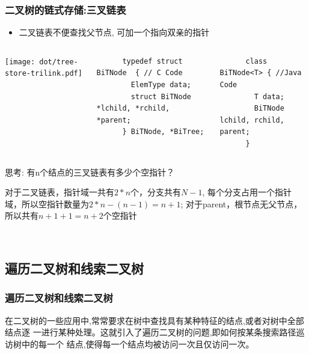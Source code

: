 \begin{frame}[fragile]
  \frametitle{二叉树的链式存储:三叉链表}
  \begin{itemize}
  \item 二叉链表不便查找父节点, 可加一个指向双亲的指针
  \end{itemize}

  \begin{columns}[T]
    \texttt{[image: dot/tree-store-trilink.pdf]}
    
    \begin{verbatim}
      typedef struct BiTNode  { // C Code
        ElemType data;
        struct BiTNode *lchild, *rchild, *parent;
      } BiTNode, *BiTree;
    \end{verbatim}

    \begin{verbatim}
      class BiTNode<T> { //Java Code
        T data;
        BiTNode lchild, rchild, parent;
      }
    \end{verbatim}
  \end{columns}

  思考: 有n个结点的三叉链表有多少个空指针？

  \pause
  \scriptsize
  对于二叉链表，指针域一共有$2*n$个，分支共有$N-1$,  每个分支占用一个指针域，所以空指针数量为$2*n - (n - 1) = n+1 $;  对于parent，根节点无父节点，所以共有$n+1+1=n+2$个空指针
\end{frame}

\begin{frame}
  ~  
\end{frame}


\subsection{遍历二叉树和线索二叉树}
\begin{frame}[fragile]
  \frametitle{遍历二叉树和线索二叉树}

  在二叉树的一些应用中,常常要求在树中查找具有某种特征的结点,或者对树中全部结点逐
  一进行某种处理。这就引入了遍历二叉树的问题,即如何按某条搜索路径巡访树中的每一个
  结点,使得每一个结点均被访问一次且仅访问一次。
\end{frame}

